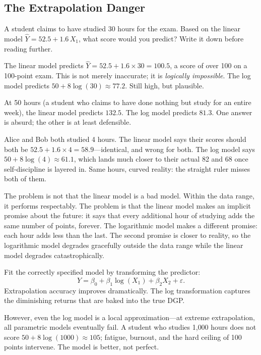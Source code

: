 \documentclass[11pt,a4paper]{article}
\theoremstyle{definition}
\theoremstyle{plain}
\theoremstyle{remark}
\begin{document}
\subsection{The Extrapolation Danger}

\begin{keyinsight}[title={Predict Before You Peek}]
A student claims to have studied 30 hours for the exam. Based on the linear model $\hat{Y} = 52.5 + 1.6\,X_1$, what score would you predict? Write it down before reading further.

\medskip
The linear model predicts $\hat{Y} = 52.5 + 1.6 \times 30 = 100.5$, a score of over 100 on a 100-point exam. This is not merely inaccurate; it is \emph{logically impossible}. The log model predicts $50 + 8\log(30) \approx 77.2$. Still high, but plausible.

At 50 hours (a student who claims to have done nothing but study for an entire week), the linear model predicts $132.5$. The log model predicts $81.3$. One answer is absurd; the other is at least defensible.
\end{keyinsight}

Alice and Bob both studied 4 hours. The linear model says their scores should both be $52.5 + 1.6 \times 4 = 58.9$---identical, and wrong for both. The log model says $50 + 8\log(4) \approx 61.1$, which lands much closer to their actual 82 and 68 once self-discipline is layered in. Same hours, curved reality: the straight ruler misses both of them.

The problem is not that the linear model is a bad model. Within the data range, it performs respectably. The problem is that the linear model makes an implicit promise about the future: it says that every additional hour of studying adds the same number of points, forever. The logarithmic model makes a different promise: each hour adds less than the last. The second promise is closer to reality, so the logarithmic model degrades gracefully outside the data range while the linear model degrades catastrophically.

\begin{repairbox}
Fit the correctly specified model by transforming the predictor:
\[
  Y = \beta_0 + \beta_1 \log(X_1) + \beta_2 X_2 + \varepsilon.
\]
Extrapolation accuracy improves dramatically. The log transformation captures the diminishing returns that are baked into the true DGP.

However, even the log model is a local approximation---at extreme extrapolation, all parametric models eventually fail. A student who studies 1{,}000 hours does not score $50 + 8\log(1000) \approx 105$; fatigue, burnout, and the hard ceiling of 100 points intervene. The model is better, not perfect.
\end{repairbox}
\end{document}
